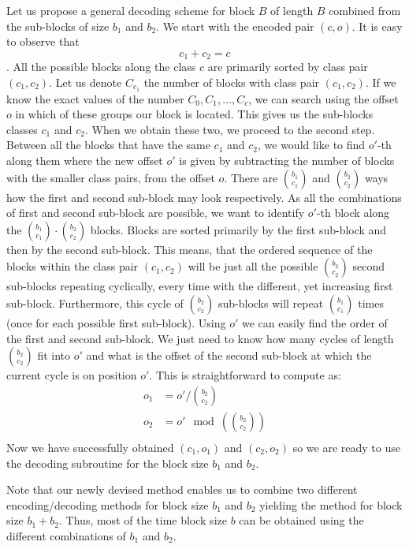 Let us propose a general decoding scheme for block $B$ of length $B$ combined from the
sub-blocks of size $b_1$ and $b_2$. We start with the encoded pair $(c, o)$. It is easy
to observe that $$c_1 + c_2 = c$$. All the possible blocks along the class $c$ are primarily
sorted by class pair $(c_1, c_2)$. Let us denote $C_{c_1}$ the number of blocks with class
pair $(c_1, c_2)$. If we know the exact values of the number $C_0, C_1, \ldots , C_c$, we can search
using the offset $o$ in which of these groups our block is located. This gives us the sub-blocks classes
$c_1$ and $c_2$. When we obtain these two, we proceed to the second step. Between all the blocks
that have the same $c_1$ and $c_2$, we would like to find $o'$-th along them where the new offset $o'$
is given by subtracting the number of blocks with the smaller class pairs, from the offset
$o$. There are ${b_1 \choose c_1}$ and ${b_2 \choose c_2}$ ways how the first and second sub-block may
look respectively. As all the combinations of first and second sub-block are possible, we want to identify
$o'$-th block along the ${b_1 \choose c_1}\cdot {b_2 \choose c_2}$ blocks. Blocks are sorted primarily
by the first sub-block and then by the second sub-block. This means, that the ordered sequence of
the blocks within the class pair $(c_1, c_2)$ will be just all the possible ${b_2 \choose c_2}$
second sub-blocks repeating cyclically, every time with the different, yet increasing
first sub-block. Furthermore, this cycle of ${b_2 \choose c_2}$ sub-blocks will repeat
${b_1 \choose c_1}$ times (once for each possible first sub-block). Using $o'$ we can easily
find the order of the first and second sub-block. We just need to know how many cycles of length
${b_2 \choose c_2}$ fit into $o'$ and what is the offset of the second sub-block at which
the current cycle is on position $o'$. This is straightforward to compute as:
\begin{align*}
    o_1 &= o'/{b_2 \choose c_2} \\
    o_2 &= o'\mod ({b_2 \choose c_2})\\ %
\end{align*}
Now we have successfully obtained $(c_1, o_1)$ and $(c_2, o_2)$ so we are ready to use
the decoding subroutine for the block size $b_1$ and $b_2$.

Note that our newly devised method enables us to combine two different encoding/decoding methods
for block size $b_1$ and $b_2$ yielding the method for block size $b_1+b_2$. Thus, most of the
time block size $b$ can be obtained using the different combinations of $b_1$ and $b_2$.

